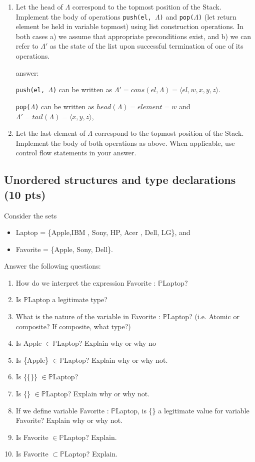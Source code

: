 \documentclass[12pt]{article}
\begin{document}
\begin{enumerate}

\item Let the head of $\Lambda$ correspond to the topmost position of the Stack. Implement the body of operations \texttt{push(el, $\Lambda$)} and \texttt{pop($\Lambda$)} (let return element be held in variable topmost) using list construction operations. In both cases a)  we assume that appropriate preconditions exist, and b) we can refer to $\Lambda'$ as the state of the list upon successful termination of one of its operations.

\noindent answer: 

\indent \texttt{push(el, $\Lambda$)}  can be written as $\Lambda' = cons( el, \Lambda) = \langle el, w, x, y, z \rangle$.


\indent \texttt{pop($\Lambda$)}  can be written as $head(\Lambda) = element = w$ and $\Lambda' = tail(\Lambda) = \langle x, y, z \rangle$,

\item  Let the last element of $\Lambda$ correspond to the topmost position of the Stack. Implement the body of both operations as above. When applicable, use control flow statements in your answer.

\end{enumerate}

\newpage

\subsection{Unordered structures and type declarations (10 pts)}
Consider the sets
\begin{itemize}
	\item Laptop = \{Apple,IBM , Sony, HP, Acer , Dell, LG\}, and
	\item Favorite = \{Apple, Sony, Dell\}.
\end{itemize}
Answer the following questions:
\begin{enumerate}
	\item How do we interpret the expression Favorite : $\mathbb{P}$Laptop?
	\item Is $\mathbb{P}$Laptop a legitimate type?
	\item What is the nature of the variable in Favorite : $\mathbb{P}$Laptop? (i.e. Atomic or composite? If composite, what type?)
	\item Is Apple $\in \mathbb{P}$Laptop? Explain why or why no
	\item Is \{Apple\} $\in \mathbb{P}$Laptop? Explain why or why not.
	\item Is \{\{\}\} $\in \mathbb{P}$Laptop?
	\item Is \{\} $\in \mathbb{P}$Laptop? Explain why or why not.
	\item If we define variable Favorite : $\mathbb{P}$Laptop, is \{\} a legitimate value for variable Favorite? Explain why or why not.
	\item Is Favorite $\in \mathbb{P}$Laptop? Explain.
	\item Is Favorite $\subset \mathbb{P}$Laptop? Explain.
\end{enumerate}
\newpage
\end{document}

